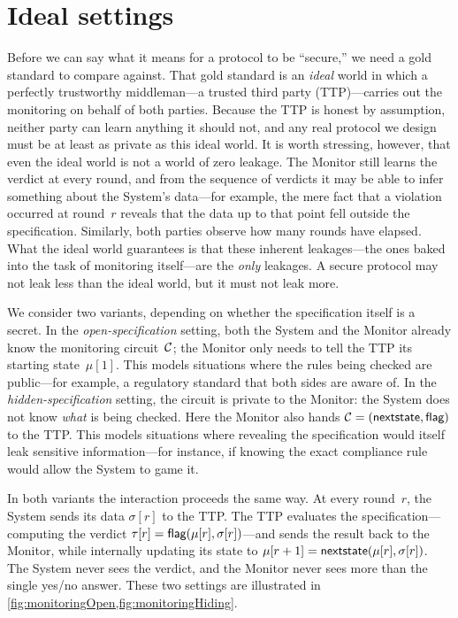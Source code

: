 \section{Ideal settings}\label{sec:ideal}

Before we can say what it means for a protocol to be ``secure,'' we need a gold standard to compare against. That gold standard is an \emph{ideal} world in which a perfectly trustworthy middleman---a trusted third party (TTP)---carries out the monitoring on behalf of both parties. Because the TTP is honest by assumption, neither party can learn anything it should not, and any real protocol we design must be at least as private as this ideal world. It is worth stressing, however, that even the ideal world is not a world of zero leakage. The Monitor still learns the verdict at every round, and from the sequence of verdicts it may be able to infer something about the System's data---for example, the mere fact that a violation occurred at round~$r$ reveals that the data up to that point fell outside the specification. Similarly, both parties observe how many rounds have elapsed. What the ideal world guarantees is that these inherent leakages---the ones baked into the task of monitoring itself---are the \emph{only} leakages. A secure protocol may not leak less than the ideal world, but it must not leak more.

We consider two variants, depending on whether the specification itself is a secret. In the \emph{open-specification} setting, both the System and the Monitor already know the monitoring circuit~$\mathcal{C}$; the Monitor only needs to tell the TTP its starting state~$\mu[1]$. This models situations where the rules being checked are public---for example, a regulatory standard that both sides are aware of. In the \emph{hidden-specification} setting, the circuit is private to the Monitor: the System does not know \emph{what} is being checked. Here the Monitor also hands $\mathcal{C} = (\textsf{nextstate},\textsf{flag})$ to the TTP. This models situations where revealing the specification would itself leak sensitive information---for instance, if knowing the exact compliance rule would allow the System to game it.

In both variants the interaction proceeds the same way. At every round~$r$, the System sends its data $\sigma[r]$ to the TTP. The TTP evaluates the specification---computing the verdict $\tau[r] = \textsf{flag}(\mu[r],\sigma[r])$---and sends the result back to the Monitor, while internally updating its state to $\mu[r+1] = \textsf{nextstate}(\mu[r],\sigma[r])$. The System never sees the verdict, and the Monitor never sees more than the single yes/no answer.
These two settings are illustrated in \cref{fig:monitoringOpen,fig:monitoringHiding}. 

